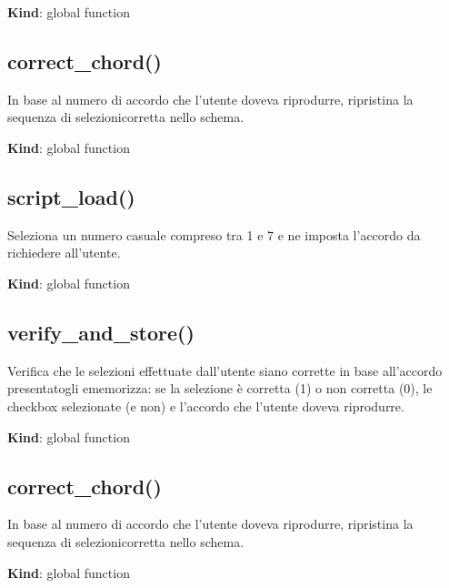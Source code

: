 \textbf{Kind}: global function\\
\protect\hypertarget{correct_chord}{}{}

\hypertarget{correct_chord-1}{%
\subsection{correct\_chord()}\label{correct_chord-1}}

In base al numero di accordo che l'utente doveva riprodurre, ripristina
la sequenza di selezionicorretta nello schema.

\textbf{Kind}: global function\\
\protect\hypertarget{script_load}{}{}

\hypertarget{script_load-2}{%
\subsection{script\_load()}\label{script_load-2}}

Seleziona un numero casuale compreso tra 1 e 7 e ne imposta l'accordo da
richiedere all'utente.

\textbf{Kind}: global function\\
\protect\hypertarget{verify_and_store}{}{}

\hypertarget{verify_and_store-2}{%
\subsection{verify\_and\_store()}\label{verify_and_store-2}}

Verifica che le selezioni effettuate dall'utente siano corrette in base
all'accordo presentatogli ememorizza: se la selezione è corretta (1) o
non corretta (0), le checkbox selezionate (e non) e l'accordo che
l'utente doveva riprodurre.

\textbf{Kind}: global function\\
\protect\hypertarget{correct_chord}{}{}

\hypertarget{correct_chord-2}{%
\subsection{correct\_chord()}\label{correct_chord-2}}

In base al numero di accordo che l'utente doveva riprodurre, ripristina
la sequenza di selezionicorretta nello schema.

\textbf{Kind}: global function
